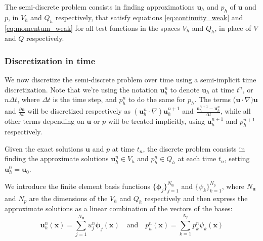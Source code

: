 The semi-discrete problem consists in finding approximations $\mathbf{u}_h$ and $p_h$ of $\mathbf{u}$ and $p$, in $V_h$ and $Q_h$ respectively, that satisfy equations \ref{eq:continuity_weak} and \ref{eq:momentum_weak} for all test functions in the spaces $V_h$ and $Q_h$, in place of $V$ and $Q$ respectively.

\subsubsection{Discretization in time}
We now discretize the semi-discrete problem over time using a semi-implicit time discretization. Note that we're using the notation $\mathbf{u}_h^n$ to denote $\mathbf{u}_h$  at time $t^n$, or $n \Delta t$, where $\Delta t$ is the time step, and $p_h^n$ to do the same for $p_h$. The terms ($\mathbf{u} \cdot \nabla) \mathbf{u}$ and $\frac{\partial \mathbf{u}}{\partial t}$ will be discretized respectively as $(\mathbf{u}_h^n \cdot \nabla) \mathbf{u}_h^{n+1}$ and $\frac{\mathbf{u}_h^{n+1} - \mathbf{u}_h^n}{\Delta t}$, while all other terms depending on $\mathbf{u}$ or $p$ will be treated implicitly, using $\mathbf{u}_h^{n+1}$ and $p^{n+1}_h$ respectively.

Given the exact solutions $\mathbf{u}$ and $p$ at time $t_n$, the discrete problem consists in finding the approximate solutions $\mathbf{u}^n_h \in V_h$ and $p^n_h \in Q_h$ at each time $t_n$, setting $\mathbf{u}_h^0 = \mathbf{u}_0$.

We introduce the finite element basis functions $\{\mathbf{\phi}_j\}_{j=1}^{N_{\mathbf{u}}}$ and $\{\psi_k\}_{k=1}^{N_p}$, where $N_{\mathbf{u}}$ and $N_p$ are the dimensions of the $V_h$ and $Q_h$ respectively and then express the approximate solutions as a linear combination of the vectors of the bases:
\begin{equation}
    \mathbf{u}^n_h(\mathbf{x}) = \sum_{j=1}^{N_{\mathbf{u}}} u_j^n \mathbf{\phi}_j(\mathbf{x}) \quad \text{and} \quad p^n_h(\mathbf{x}) = \sum_{k=1}^{N_p} p_k^n \psi_k(\mathbf{x})
\end{equation}

